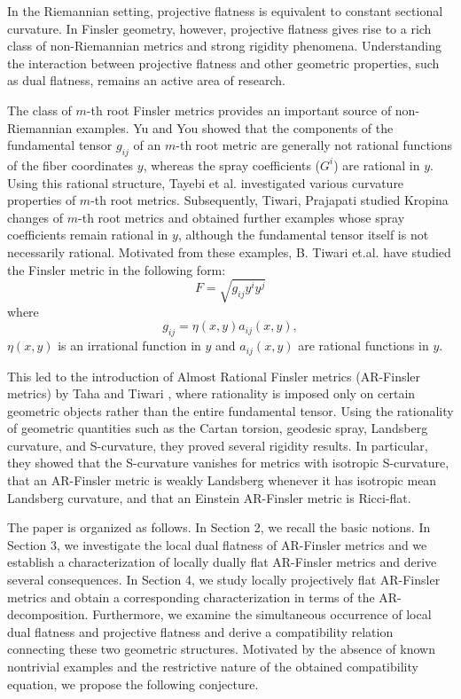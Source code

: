 \documentclass[12pt]{article}
\theoremstyle{definition}
\begin{document}
In the Riemannian setting, projective flatness is equivalent to constant sectional curvature. In Finsler geometry, however, projective flatness gives rise to a rich class of non-Riemannian metrics and strong rigidity phenomena. Understanding the interaction between projective flatness and other geometric properties, such as dual flatness, remains an active area of research.

The class of $m$-th root Finsler metrics provides an important source of non-Riemannian examples. Yu and You \cite{YY10} showed that the components of the fundamental tensor $g_{ij}$ of an $m$-th root metric are generally not rational functions of the fiber coordinates $y$, whereas the spray coefficients ($G^i$) are rational in $y$. Using this rational structure, Tayebi et al. \cite{AB11, AAE14, AAE} investigated various curvature properties of $m$-th root metrics. Subsequently, Tiwari, Prajapati \cite{BG,BG1} studied Kropina changes of $m$-th root metrics and obtained further examples whose spray coefficients remain rational in $y$, although the fundamental tensor itself is not necessarily rational. Motivated from these examples, B. Tiwari et.al.   \cite{BGR} have studied the Finsler metric in the following form:
\begin{equation}\label{eq1.1}
{F}=\sqrt{g_{ij}y^iy^j}
\end{equation} where
\begin{equation}\label{eq1.2}
g_{ij}=\eta(x,y)a_{ij}(x,y),
\end{equation}
$\eta(x,y)$ is an irrational function in $y$ and $a_{ij}(x,y)$ are rational functions in $y$.


This led to the introduction of Almost Rational Finsler metrics (AR-Finsler metrics) by Taha and Tiwari \cite{taha2023}, where rationality is imposed only on certain geometric objects rather than the entire fundamental tensor. Using the rationality of geometric quantities such as the Cartan torsion, geodesic spray, Landsberg curvature, and S-curvature, they proved several rigidity results. In particular, they showed that the S-curvature vanishes for metrics with isotropic S-curvature, that an AR-Finsler metric is weakly Landsberg whenever it has isotropic mean Landsberg curvature, and that an Einstein AR-Finsler metric is Ricci-flat.

The paper is organized as follows. In Section 2, we recall the basic notions. In Section 3, we investigate the local dual flatness of AR-Finsler metrics and we establish a characterization of locally dually flat AR-Finsler metrics and derive several consequences. In Section 4, we study locally projectively flat AR-Finsler metrics and obtain a corresponding characterization in terms of the AR-decomposition. Furthermore, we examine the simultaneous occurrence of local dual flatness and projective flatness and derive a compatibility relation connecting these two geometric structures. Motivated by the absence of known nontrivial examples and the restrictive nature of the obtained compatibility equation, we propose the following conjecture.
\end{document}
